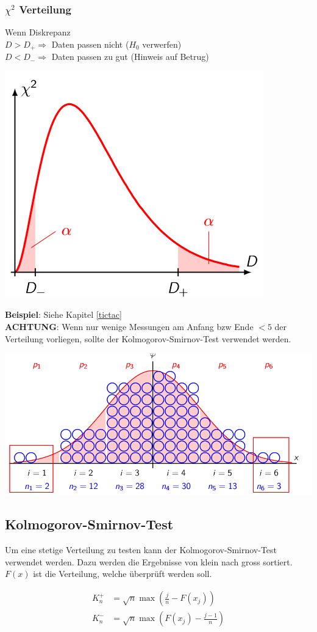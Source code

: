 \subsubsection{$\chi^2$ Verteilung}\label{chi-verteilung}
Wenn Diskrepanz\\
$D>D_+ \Rightarrow$ Daten passen nicht ($H_0$ verwerfen)\\
$D < D_- \Rightarrow$ Daten passen zu gut (Hinweis auf Betrug)
\begin{center}
	\includegraphics[width=0.6\columnwidth]{Images/chi-verteilung}
\end{center}

\noindent\textbf{Beispiel}: Siehe Kapitel \ref{tictac}
\\
\noindent\textbf{ACHTUNG}: Wenn nur wenige Messungen am Anfang bzw Ende $<5$ der Verteilung vorliegen, sollte der Kolmogorov-Smirnov-Test verwendet werden.
\begin{center}
	\includegraphics[width=0.4\columnwidth]{Images/chi-verteilung-fail}
\end{center}

\subsection{Kolmogorov-Smirnov-Test}
Um eine stetige Verteilung zu testen kann der Kolmogorov-Smirnov-Test verwendet werden. Dazu werden die Ergebnisse von klein nach gross sortiert. $F(x)$ ist die Verteilung, welche überprüft werden soll. 

\begin{align*}
	K_n^+ &= \sqrt{n}\max\left(\frac{j}{n} - F(x_j)\right) \\
	K_n^- &= \sqrt{n}\max\left(F(x_j) - \frac{j-1}{n}\right) \\
\end{align*}

